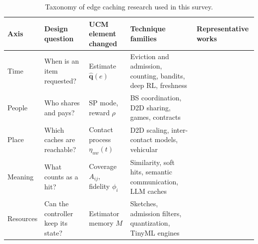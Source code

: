 \begin{table}[t]
\centering
\caption{Taxonomy of edge caching research used in this survey.}
\label{tab:taxonomy}
\footnotesize
\setlength{\tabcolsep}{3pt}
\renewcommand{\arraystretch}{1.15}
\begin{tabular}{@{}>{\raggedright\arraybackslash}p{40.0pt}>{\raggedright\arraybackslash}p{130.0pt}>{\raggedright\arraybackslash}p{95.0pt}>{\raggedright\arraybackslash}p{112.0pt}>{\raggedright\arraybackslash}p{115.0pt}@{}}
\toprule
Axis & Design question & UCM element changed & Technique families & Representative works \\
\midrule
Time & When is an item requested? & Estimate $\hat{\mathbf q}(e)$ & Eviction and admission, counting, bandits, deep RL, freshness & \cite{che2002hierarchical,megiddo2003arc,einziger2017tinylfu,bastug2014living,blasco2014learning,chen2017echo,zhong2018drl,yates2017ageoptimal} \\
People & Who shares and pays? & SP mode, reward $\rho$ & BS coordination, D2D sharing, games, contracts & \cite{shanmugam2013femtocaching,poularakis2016multicast,golrezaei2013femtocaching,chen2016d2dstackelberg,hamidouche2016contracts,li2021evolutionary,hosny2015marketplace} \\
Place & Which caches are reachable? & Contact process $\eta_{uw}(t)$ & D2D scaling, inter-contact models, vehicular & \cite{ji2016fundamental,hosny2016impact,wang2017mobility,wang2018exploiting,chen2017echo,qiao2020drl,alnagar2019city} \\
Meaning & What counts as a hit? & Coverage $A_{ij}$, fidelity $\phi_i$ & Similarity, soft hits, semantic communication, LLM caches & \cite{chierichetti2009similarity,garetto2020similarity,sermpezis2018soft,yu2023semcache,gill2024meancache,schroeder2026vcache} \\
Resources & Can the controller keep its state? & Estimator memory $M$ & Sketches, admission filters, quantization, TinyML engines & \cite{metwally2005spacesaving,cormode2005countmin,einziger2017tinylfu,jacob2018quantization,lin2020mcunet,capogrosso2024tinyml} \\
\bottomrule
\end{tabular}
\end{table}

